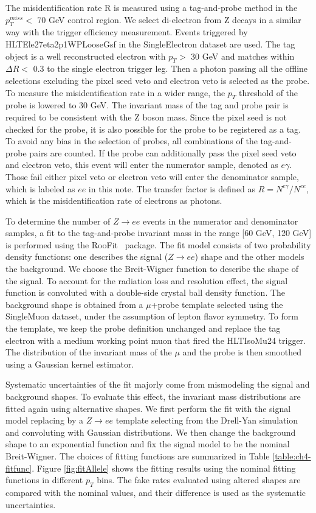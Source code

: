 \documentclass[thesis.tex]{subfiles}
\renewcommand\_{\textunderscore\allowbreak}
\begin{document}
The misidentification rate R is measured using a tag-and-probe method in the $p_T^{miss} < $ 70 GeV control region. We select di-electron from Z decays in a similar way with the trigger efficiency measurement. Events triggered by HLT\_Ele27\_eta2p1\_WPLoose\_Gsf in the SingleElectron dataset are used. The tag object is a well reconstructed electron with $p_T >$ 30 GeV and matches within $\Delta R <$ 0.3 to the single electron trigger leg. Then a photon passing all the offline selections excluding the pixel seed veto and electron veto is selected as the probe. To measure the misidentification rate in a wider range, the $p_T$ threshold of the probe is lowered to 30 GeV. The invariant mass of the tag and probe pair is required to be consistent with the Z boson mass. Since the pixel seed is not checked for the probe, it is also possible for the probe to be registered as a tag. To avoid any bias in the selection of probes, all combinations of the tag-and-probe pairs are counted. If the probe can additionally pass the pixel seed veto and electron veto, this event will enter the numerator sample, denoted as $e\gamma$. Those fail either pixel veto or electron veto will enter the denominator sample, which is labeled as $ee$ in this note. The transfer factor is defined as $R = N^{e\gamma}/N^{ee}$, which is the misidentification rate of electrons as photons.

To determine the number of $Z\rightarrow ee$ events in the numerator and denominator samples, a fit to the tag-and-probe invariant mass in the range [60 GeV, 120 GeV] is performed using the RooFit~\cite{RooFit} package. The fit model consists of two probability density functions: one describes the signal ($Z\rightarrow ee$) shape and the other models the background. We choose the Breit-Wigner function to describe the shape of the signal. To account for the radiation loss and resolution effect, the signal function is convoluted with a double-side crystal ball density function. The background shape is obtained from a $\mu$+probe template selected using the SingleMuon dataset, under the assumption of lepton flavor symmetry.  To form the template, we keep the probe definition unchanged and replace the tag electron with a medium working point muon that fired the HLT\_IsoMu24 trigger. The distribution of the invariant mass of the $\mu$ and the probe is then smoothed using a Gaussian kernel estimator. 

Systematic uncertainties of the fit majorly come from mismodeling the signal and background shapes. To evaluate this effect, the invariant mass distributions are fitted again using alternative shapes. We first perform the fit with the signal model replacing by a $Z\rightarrow ee$ template selecting from the Drell-Yan simulation and convoluting with Gaussian distributions. We then change the background shape to an exponential function and fix the signal model to be the nominal Breit-Wigner. The choices of fitting functions are summarized in Table \ref{table:ch4-fitfunc}. Figure \ref{fig:fitAllele} shows the fitting results using the nominal fitting functions in different $p_T$ bins. The fake rates evaluated using altered shapes are compared with the nominal values, and their difference is used as the systematic uncertainties.
\end{document}
